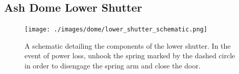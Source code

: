 \documentclass[12pt,titlepage]{article}
\begin{document}
\begin{appendix}
\section{Ash Dome Lower Shutter}

\begin{figure}[H] 
	\begin{center}
		\texttt{[image: ./images/dome/lower\_shutter\_schematic.png]} 
		\label{azimuth_motor}
	\end{center}
	\caption{A schematic detailing the components of the lower shutter.
			In the event of power loss, unhook the spring marked by the dashed circle in
			order to disengage the spring arm and close the door.}
	\label{apdx:lower_shutter}
\end{figure}


\end{appendix}


\newpage
\nocite{*}
{}	

\clearpage
\end{document}
